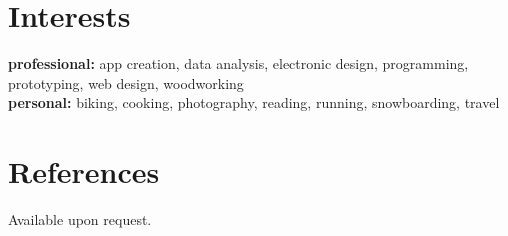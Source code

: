 \documentclass[hidelinks]{kkurucz-cv}
\begin{document}

\section{Interests}

\textbf{professional:} app creation, data analysis, electronic design, programming, prototyping, web design, woodworking
\\
\textbf{personal:}  biking, cooking, photography, reading, running, snowboarding, travel
\vspace{2mm}

\section{References}

{Available upon request.}
\end{document}
